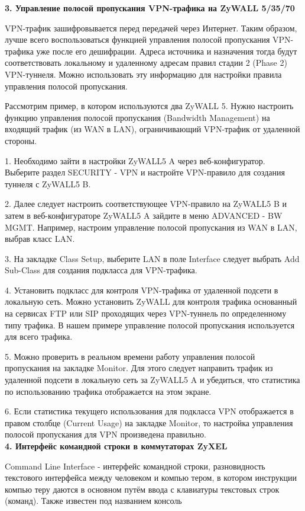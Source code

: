 \documentclass[12pt]{article}
\begin{document}
{\bf 3. Управление полосой пропускания VPN-трафика на ZyWALL 5/35/70}

 VPN-трафик зашифровывается перед передачей через Интернет. Таким образом, лучше всего воспользоваться функцией управления полосой пропускания VPN-трафика уже после его дешифрации. Адреса источника и назначения тогда будут соответствовать локальному и удаленному адресам правил стадии 2 (Phase 2) VPN-туннеля. Можно использовать эту информацию для настройки правила управления полосой пропускания.

Рассмотрим пример, в котором используются два ZyWALL 5. Нужно настроить функцию управления полосой пропускания (Bandwidth Management) на входящий трафик (из WAN в LAN), ограничивающий VPN-трафик от удаленной стороны.

1. Необходимо зайти в настройки ZyWALL5 A через веб-конфигуратор. Выберите раздел SECURITY - VPN и настройте VPN-правило для создания туннеля с ZyWALL5 B.

2. Далее следует настроить соответствующее VPN-правило на ZyWALL5 B и затем в веб-конфигураторе ZyWALL5 A зайдите в меню ADVANCED - BW MGMT. Например, настроим управление полосой пропускания из WAN в LAN, выбрав класс LAN.


3. На закладке Class Setup, выберите LAN в поле Interface следует выбрать Add Sub-Class для создания подкласса для VPN-трафика.

4. Установить подкласс для контроля VPN-трафика от удаленной подсети в локальную сеть. Можно установить ZyWALL для контроля трафика основанный на сервисах FTP или SIP проходящих через VPN-туннель по определенному типу трафика. В нашем примере управление полосой пропускания используется для всего трафика.

5. Можно проверить в реальном времени работу управления полосой пропускания на закладке Monitor. Для этого следует направить трафик из удаленной подсети в локальную сеть за ZyWALL5 A и убедиться, что статистика по использованию трафика отображается на этом экране.

6. Если статистика текущего использования для подкласса VPN отображается в правом столбце (Current Usage) на закладке Monitor, то настройка управления полосой пропускания для VPN произведена правильно.\\

{\bf 4. Интерфейс командной строки в коммутаторах ZyXEL}

Command
Line Interface -
интерфейс
командной
строки,
разновидность
текстового
интерфейса
между человеком и компью
тером,
в котором
инструкции
компью
теру даются в основном
путём
ввода с
клавиатуры текстовых строк (команд).
Также известен под
названием
консоль
\end{document}
